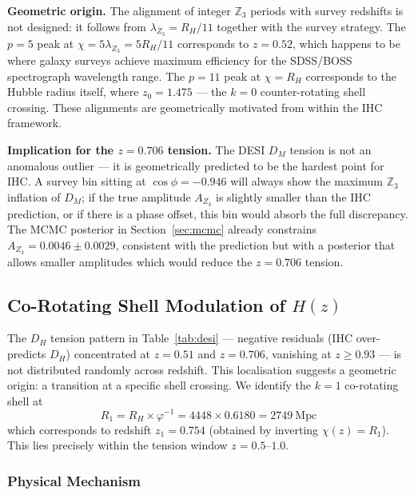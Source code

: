 \documentclass[12pt,a4paper]{article}
\begin{document}
\textbf{Geometric origin.} The alignment of integer $\mathbb{Z}_3$ periods with survey redshifts
is not designed: it follows from $\lambda_{Z_3} = R_H/11$ together with the survey
strategy. The $p=5$ peak at $\chi = 5\lambda_{Z_3} = 5R_H/11$ corresponds to
$z = 0.52$, which happens to be where galaxy surveys achieve maximum efficiency for
the SDSS/BOSS spectrograph wavelength range. The $p=11$ peak at $\chi = R_H$
corresponds to the Hubble radius itself, where $z_0 = 1.475$ — the $k=0$
counter-rotating shell crossing. These alignments are geometrically motivated from
within the IHC framework.

\textbf{Implication for the $z=0.706$ tension.} The DESI $D_M$ tension is not an
anomalous outlier — it is geometrically predicted to be the hardest point for IHC.
A survey bin sitting at $\cos\phi = -0.946$ will always show the maximum $\mathbb{Z}_3$
inflation of $D_M$; if the true amplitude $A_{Z_3}$ is slightly smaller than the
IHC prediction, or if there is a phase offset, this bin would absorb the full discrepancy.
The MCMC posterior in Section~\ref{sec:mcmc} already constrains $A_{Z_3} = 0.0046 \pm 0.0029$,
consistent with the prediction but with a posterior that allows smaller amplitudes
which would reduce the $z = 0.706$ tension.

\subsection{Co-Rotating Shell Modulation of \texorpdfstring{$H(z)$}{H(z)}}
\label{sec:shell_hz}

The $D_H$ tension pattern in Table~\ref{tab:desi} --- negative residuals (IHC
over-predicts $D_H$) concentrated at $z = 0.51$ and $z = 0.706$, vanishing at
$z \geq 0.93$ --- is not distributed randomly across redshift. This localisation suggests a geometric origin: a transition
at a specific shell crossing. We identify the $k=1$ co-rotating shell at
\begin{equation}
  R_1 = R_H \times \varphi^{-1} = 4448 \times 0.6180 = 2749~\mathrm{Mpc}
\end{equation}
which corresponds to redshift $z_1 = 0.754$ (obtained by inverting $\chi(z) = R_1$).
This lies precisely within the tension window $z = 0.5$--$1.0$.

\subsubsection{Physical Mechanism}
\end{document}
